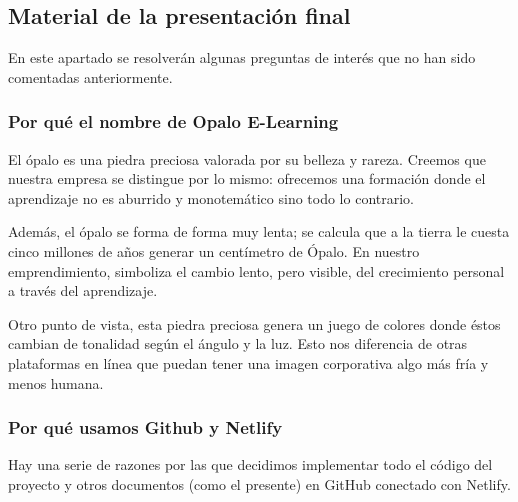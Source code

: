 \documentclass[11.5pt]{article}
\begin{document}
	\subsection{Material de la presentación final}
	
	En este apartado se resolverán algunas preguntas de interés que no han sido comentadas anteriormente.
	
	\subsubsection{Por qué el nombre de Opalo E-Learning}
	
	El ópalo es una piedra preciosa valorada por su belleza y rareza. Creemos que nuestra empresa se distingue por lo mismo: ofrecemos una formación donde el aprendizaje no es aburrido y monotemático sino todo lo contrario.
	
	Además, el ópalo se forma de forma muy lenta; se calcula que a la tierra le cuesta cinco millones de años generar un centímetro de Ópalo. En nuestro emprendimiento, simboliza el cambio lento, pero visible, del crecimiento personal a través del aprendizaje.
	
	Otro punto de vista, esta piedra preciosa genera un juego de colores donde éstos cambian de tonalidad según el ángulo y la luz. Esto nos diferencia de otras plataformas en línea que puedan tener una imagen corporativa algo más fría y menos humana.
	
	\subsubsection{Por qué usamos Github y Netlify}
	
	Hay una serie de razones por las que decidimos implementar todo el código del proyecto y otros documentos (como el presente) en GitHub conectado con Netlify.
	
\end{document}
